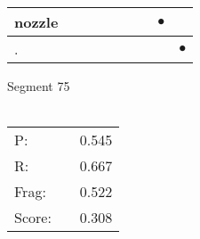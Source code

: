 \documentclass[landscape]{article}
\newcommand{\ssp}{\hspace{2pt}}
\newcommand{\mex}{\cellcolor{g}$\bullet$}
\begin{document}
\begin{tabular}{|l|p{10pt}|p{10pt}|p{10pt}|p{10pt}|p{10pt}|p{10pt}|p{10pt}|p{10pt}|}
\hline
\ssp \cellcolor{ref6}nozzle \ssp&\hspace{2pt}&\hspace{2pt}&\hspace{2pt}&\hspace{2pt}&\hspace{2pt}&\hspace{2pt}&\hspace{2pt}\mex&\hspace{2pt}\\
\hline
\ssp \cellcolor{ref7}. \ssp&\hspace{2pt}&\hspace{2pt}&\hspace{2pt}&\hspace{2pt}&\hspace{2pt}&\hspace{2pt}&\hspace{2pt}&\hspace{2pt}\mex\\
\hline
\end{tabular}

\vspace{6pt}
\noindent Segment 75\\\\
\noindent\begin{tabular}{lm{12pt}r}
\hline
P:&&0.545\\
R:&&0.667\\
Frag:&&0.522\\
Score:&&0.308\\
\end{tabular}

\newpage
\end{document}
